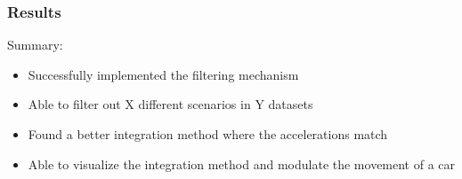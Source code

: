 \begin{frame}
  \frametitle{Results}
    Summary:
    \begin{itemize}[<+->]
      \item Successfully implemented the filtering mechanism
      \item Able to filter out X different scenarios in Y datasets
      \item Found a better integration method where the accelerations match
      \item Able to visualize the integration method and modulate the movement of a car
    \end{itemize}
\end{frame}

